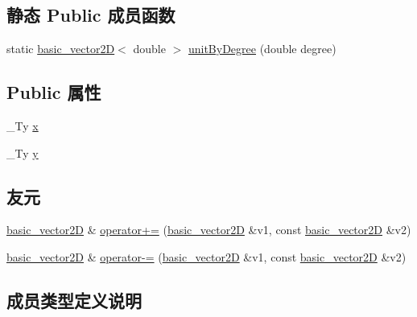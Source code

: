 \subsection*{静态 Public 成员函数}
\begin{DoxyCompactItemize}
\item 
static \hyperlink{structbasic__vector2_d}{basic\+\_\+vector2D}$<$ double $>$ \hyperlink{structbasic__vector2_d_aa31b5b9b9261d28ecd2626ba38b61278}{unit\+By\+Degree} (double degree)
\end{DoxyCompactItemize}
\subsection*{Public 属性}
\begin{DoxyCompactItemize}
\item 
\+\_\+\+Ty \hyperlink{structbasic__vector2_d_a9f606d50a5993d8c8f3834e67e2e750d}{x}
\item 
\+\_\+\+Ty \hyperlink{structbasic__vector2_d_ad874ba527147096c9ee6c56ded52be73}{y}
\end{DoxyCompactItemize}
\subsection*{友元}
\begin{DoxyCompactItemize}
\item 
\hyperlink{structbasic__vector2_d}{basic\+\_\+vector2D} \& \hyperlink{structbasic__vector2_d_adb9aa08ea9517ddbfd6d610e270a1a0e}{operator+=} (\hyperlink{structbasic__vector2_d}{basic\+\_\+vector2D} \&v1, const \hyperlink{structbasic__vector2_d}{basic\+\_\+vector2D} \&v2)
\item 
\hyperlink{structbasic__vector2_d}{basic\+\_\+vector2D} \& \hyperlink{structbasic__vector2_d_a840973b019d576292fcfbb982e351314}{operator-\/=} (\hyperlink{structbasic__vector2_d}{basic\+\_\+vector2D} \&v1, const \hyperlink{structbasic__vector2_d}{basic\+\_\+vector2D} \&v2)
\end{DoxyCompactItemize}


\subsection{成员类型定义说明}
\mbox{\label{structbasic__vector2_d_afa9c650d6178f708c88f7abab001c4a3}} 
